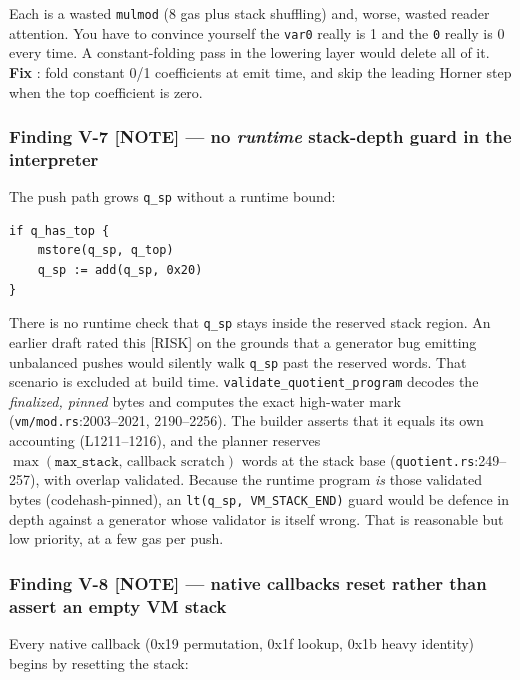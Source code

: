 Each is a wasted \texttt{mulmod} (8 gas plus stack shuffling) and,
worse, wasted reader attention. You have to convince yourself the
\texttt{var0} really is 1 and the \texttt{0} really is 0 every time.
A constant-folding pass in the lowering layer would delete all of it.
\textbf{Fix} : fold constant 0/1 coefficients at emit
time, and skip the leading Horner step when the top coefficient is
zero.

\subsubsection*{Finding V-7 \textcolor{mathpurple}{[NOTE]} --- no \emph{runtime} stack-depth guard in the interpreter}

The push path grows \texttt{q\_sp} without a runtime bound:

\begin{lstlisting}[style=yul]
if q_has_top {
    mstore(q_sp, q_top)
    q_sp := add(q_sp, 0x20)
}
\end{lstlisting}

There is no runtime check that \texttt{q\_sp} stays inside the
reserved stack region.  An earlier draft rated this
[RISK] on the grounds that a generator bug emitting unbalanced
pushes would silently walk \texttt{q\_sp} past the reserved words.
That scenario is excluded at build time.
\texttt{validate\_\allowbreak{}quotient\_\allowbreak{}program} decodes the \emph{finalized,
pinned} bytes and computes the exact high-water mark
(\texttt{vm/mod.rs}:2003--2021, 2190--2256). The builder asserts
that it equals its own accounting (L1211--1216), and the planner
reserves $\max(\texttt{max\_stack},\,\text{callback scratch})$
words at the stack base (\texttt{quotient.rs}:249--257), with
overlap validated. Because the runtime program \emph{is} those
validated bytes (codehash-pinned), an
\texttt{lt(q\_\allowbreak{}sp, VM\_\allowbreak{}STACK\_\allowbreak{}END)} guard would be defence in depth
against a generator whose validator is itself wrong. That is
reasonable but low priority, at a few gas per push.

\subsubsection*{Finding V-8 \textcolor{mathpurple}{[NOTE]} --- native callbacks reset rather than assert an empty VM stack}

Every native callback (0x19 permutation, 0x1f lookup, 0x1b heavy
identity) begins by resetting the stack:

